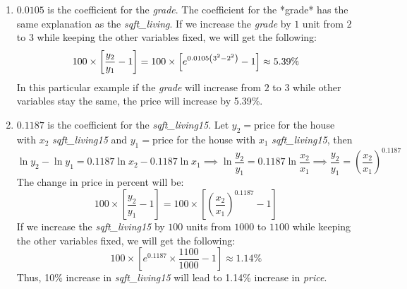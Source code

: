 \documentclass[10pt]{article}
\begin{document}
\begin{enumerate}
\item $0.0105$ is the coefficient for the {\it grade}.  The coefficient for the *grade* has the same explanation as the {\it sqft\_living}. If we increase the {\it grade} by $1$ unit from $2$ to $3$ while keeping the other variables fixed, we will get the following:
$$
\large 
100 \times \left[\frac{y_2}{y_1} -1  \right] = 100 \times \left[ e^{0.0105\left( 3^{2} - 2^{2}\right)} - 1 \right]\approx 5.39\%
$$
In this particular example if the {\it grade} will increase from $2$ to $3$ while other variables stay the same, the price will increase by 5.39\%.
 \item $0.1187$ is the coefficient for the {\it sqft\_living15}. Let $y_2 = \text{price}$ for the house with $x_2$ {\it sqft\_living15} and $y_1 = \text{price}$ for the house with $x_1$ {\it sqft\_living15}, then 
$$
\ln y_2 - \ln y_1 = 0.1187 \ln x_2 - 0.1187 \ln x_1 \implies \ln \frac{y_2}{y_1} = 0.1187 \ln \frac{x_2}{x_1} \implies \frac{y_2}{y_1} = \left(\frac{x_2}{x_1}\right)^{0.1187}
$$
The change in price in percent will be:
$$
100 \times \left[\frac{y_2}{y_1} - 1 \right]= 100 \times \left[ \left(\frac{x_2}{x_1}\right)^{0.1187} - 1 \right]
$$
If we increase the {\it sqft\_living15} by $100$ units from $1000$ to $1100$ while keeping the other variables fixed, we will get the following:
$$
100 \times \left[ e^{0.1187}\times \frac{1100}{1000} - 1 \right] \approx 1.14\%
$$
Thus, 10\% increase in {\it sqft\_living15} will lead to 1.14\% increase in {\it price}.
 \end{enumerate}
\end{document}
